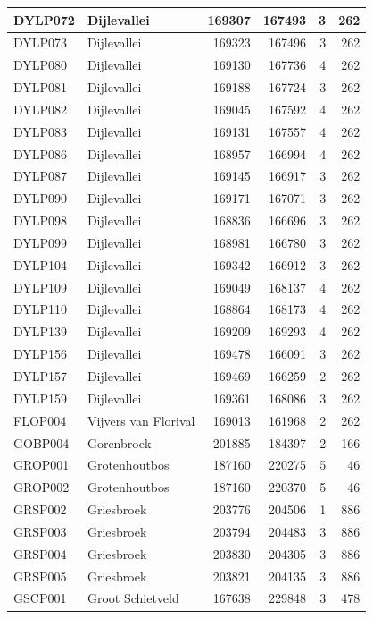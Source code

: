 \documentclass[11pt,]{book}
\begin{document}
\begin{table}
\begin{tabular}[t]{l|l|r|r|r|r}
\hline
DYLP072 & Dijlevallei & 169307 & 167493 & 3 & 262\\
\hline
DYLP073 & Dijlevallei & 169323 & 167496 & 3 & 262\\
\hline
DYLP080 & Dijlevallei & 169130 & 167736 & 4 & 262\\
\hline
DYLP081 & Dijlevallei & 169188 & 167724 & 3 & 262\\
\hline
DYLP082 & Dijlevallei & 169045 & 167592 & 4 & 262\\
\hline
DYLP083 & Dijlevallei & 169131 & 167557 & 4 & 262\\
\hline
DYLP086 & Dijlevallei & 168957 & 166994 & 4 & 262\\
\hline
DYLP087 & Dijlevallei & 169145 & 166917 & 3 & 262\\
\hline
DYLP090 & Dijlevallei & 169171 & 167071 & 3 & 262\\
\hline
DYLP098 & Dijlevallei & 168836 & 166696 & 3 & 262\\
\hline
DYLP099 & Dijlevallei & 168981 & 166780 & 3 & 262\\
\hline
DYLP104 & Dijlevallei & 169342 & 166912 & 3 & 262\\
\hline
DYLP109 & Dijlevallei & 169049 & 168137 & 4 & 262\\
\hline
DYLP110 & Dijlevallei & 168864 & 168173 & 4 & 262\\
\hline
DYLP139 & Dijlevallei & 169209 & 169293 & 4 & 262\\
\hline
DYLP156 & Dijlevallei & 169478 & 166091 & 3 & 262\\
\hline
DYLP157 & Dijlevallei & 169469 & 166259 & 2 & 262\\
\hline
DYLP159 & Dijlevallei & 169361 & 168086 & 3 & 262\\
\hline
FLOP004 & Vijvers van Florival & 169013 & 161968 & 2 & 262\\
\hline
GOBP004 & Gorenbroek & 201885 & 184397 & 2 & 166\\
\hline
GROP001 & Grotenhoutbos & 187160 & 220275 & 5 & 46\\
\hline
GROP002 & Grotenhoutbos & 187160 & 220370 & 5 & 46\\
\hline
GRSP002 & Griesbroek & 203776 & 204506 & 1 & 886\\
\hline
GRSP003 & Griesbroek & 203794 & 204483 & 3 & 886\\
\hline
GRSP004 & Griesbroek & 203830 & 204305 & 3 & 886\\
\hline
GRSP005 & Griesbroek & 203821 & 204135 & 3 & 886\\
\hline
GSCP001 & Groot Schietveld & 167638 & 229848 & 3 & 478\\

\end{tabular}
\end{table}
\end{document}
